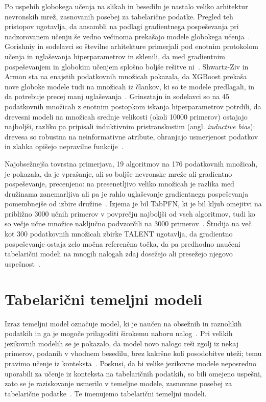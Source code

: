 \documentclass[a4paper,12pt,openright]{book}
\begin{document}
Po uspehih globokega učenja na slikah in
besedilu je nastalo veliko arhitektur nevronskih mrež, zasnovanih posebej za
tabelarične podatke. Pregled teh pristopov ugotavlja, da ansambli na podlagi
gradientnega pospeševanja pri nadzorovanem
učenju še vedno večinoma prekašajo modele globokega
učenja~\cite{borisov2024deep}. Gorishniy in sodelavci so številne arhitekture
primerjali pod enotnim protokolom učenja in uglaševanja hiperparametrov in
sklenili, da med gradientnim
pospeševanjem in globokim učenjem splošno boljše rešitve
ni~\cite{gorishniy2021revisiting}. Shwartz-Ziv in Armon sta na enajstih
podatkovnih množicah pokazala, da XGBoost prekaša nove globoke modele tudi na
množicah iz člankov, ki so te modele predlagali, in da potrebuje precej manj
uglaševanja~\cite{shwartzziv2022tabular}. Grinsztajn in sodelavci so na 45
podatkovnih množicah z enotnim postopkom iskanja hiperparametrov potrdili, da
drevesni modeli na množicah srednje velikosti (okoli \num{10000} primerov)
ostajajo najboljši, razliko pa pripisali induktivnim pristranskostim (angl.
\emph{inductive bias}): drevesa so robustna na neinformativne atribute,
ohranjajo usmerjenost podatkov in zlahka opišejo nepravilne
funkcije~\cite{grinsztajn2022why}.

Najobsežnejša tovrstna primerjava, 19 algoritmov na 176 podatkovnih množicah,
je pokazala, da je vprašanje, ali so boljše nevronske mreže ali gradientno
pospeševanje, precenjeno: na presenetljivo veliko množicah je razlika med
družinama zanemarljiva ali pa je rahlo uglaševanje gradientnega pospeševanja
pomembnejše od izbire družine~\cite{mcelfresh2023neural}. Izjema je bil
TabPFN, ki je bil kljub omejitvi na približno 3000 učnih primerov v povprečju
najboljši od vseh algoritmov, tudi ko so večje učne množice naključno
podvzorčili na 3000 primerov~\cite{mcelfresh2023neural}. Študija na več kot
300 podatkovnih množicah zbirke TALENT ugotavlja, da gradientno pospeševanje
ostaja zelo močna referenčna točka, da pa predhodno naučeni tabelarični modeli
na mnogih nalogah zdaj dosežejo ali presežejo njegovo
uspešnost~\cite{ye2024closer}.

\section{Tabelarični temeljni modeli}
\label{sec:sor-temeljni}

Izraz temeljni model označuje model, ki je
naučen na obsežnih in raznolikih podatkih in ga je mogoče prilagoditi
širokemu naboru nalog~\cite{bommasani2021opportunities}. Pri velikih jezikovnih
modelih se je pokazalo, da model novo nalogo reši zgolj iz nekaj primerov,
podanih v vhodnem besedilu, brez kakršne koli posodobitve uteži; temu pravimo
učenje iz konteksta~\cite{brown2020language}.
Poskusi, da bi velike jezikovne modele neposredno uporabili za učenje iz
konteksta na tabelaričnih podatkih, so bili omejeno uspešni, zato se je
raziskovanje usmerilo v temeljne modele, zasnovane posebej za tabelarične
podatke~\cite{ma2025tabdpt}. Te imenujemo tabelarični temeljni modeli.
\end{document}
